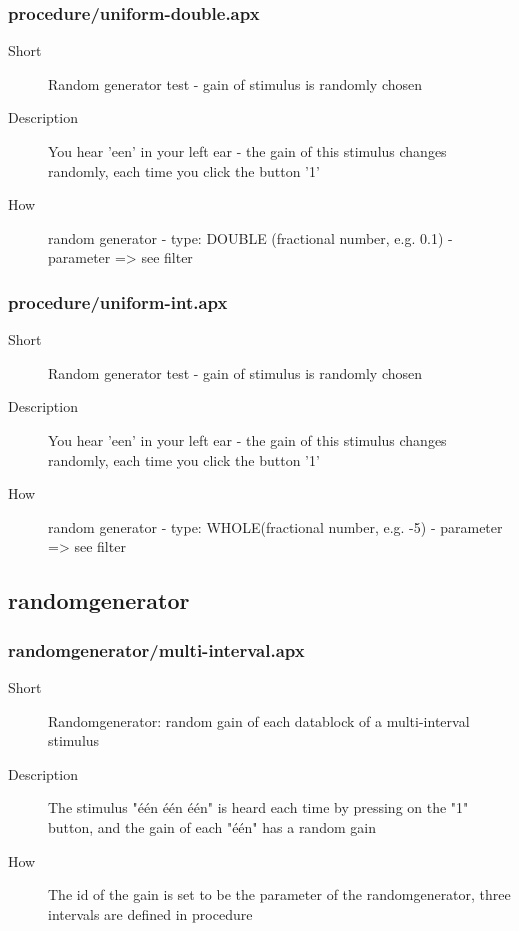 \subsubsection{procedure/uniform-double.apx}
\begin{description}
\item[Short] 
 Random generator test - gain of stimulus is randomly chosen
\item[Description] 
 You hear 'een' in your left ear - the gain of this stimulus changes randomly, each time you click the button '1'
\item[How] 
 random generator - type: DOUBLE (fractional number, e.g. 0.1) - parameter =\textgreater{} see filter
\end{description}

\subsubsection{procedure/uniform-int.apx}
\begin{description}
\item[Short] 
 Random generator test - gain of stimulus is randomly chosen
\item[Description] 
 You hear 'een' in your left ear - the gain of this stimulus changes randomly, each time you click the button '1'
\item[How] 
 random generator - type: WHOLE(fractional number, e.g. -5) - parameter =\textgreater{} see filter
\end{description}

\subsection{randomgenerator}
\subsubsection{randomgenerator/multi-interval.apx}
\begin{description}
\item[Short] 
 Randomgenerator: random gain of each datablock of a multi-interval stimulus
\item[Description] 
 The stimulus "één één één" is heard each time by pressing on the "1" button, and the gain of each "één" has a random gain
\item[How] 
 The id of the gain is set to be the parameter of the randomgenerator, three intervals are defined in procedure
\end{description}

